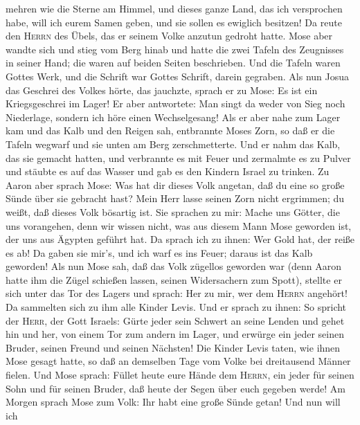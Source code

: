 mehren wie die Sterne am Himmel, und dieses ganze Land, das ich
versprochen habe, will ich eurem Samen geben, und sie sollen es ewiglich
besitzen!  Da reute den \textsc{Herrn} des Übels, das er
seinem Volke anzutun gedroht hatte.  Mose aber wandte
sich und stieg vom Berg hinab und hatte die zwei Tafeln des Zeugnisses
in seiner Hand; die waren auf beiden Seiten beschrieben. 
Und die Tafeln waren Gottes Werk, und die Schrift war Gottes Schrift,
darein gegraben.  Als nun Josua das Geschrei des Volkes
hörte, das jauchzte, sprach er zu Mose: Es ist ein Kriegsgeschrei im
Lager!  Er aber antwortete: Man singt da weder von Sieg
noch Niederlage, sondern ich höre einen Wechselgesang! 
Als er aber nahe zum Lager kam und das Kalb und den Reigen sah,
entbrannte Moses Zorn, so daß er die Tafeln wegwarf und sie unten am
Berg zerschmetterte.  Und er nahm das Kalb, das sie
gemacht hatten, und verbrannte es mit Feuer und zermalmte es zu Pulver
und stäubte es auf das Wasser und gab es den Kindern Israel zu trinken.
 Zu Aaron aber sprach Mose: Was hat dir dieses Volk
angetan, daß du eine so große Sünde über sie gebracht hast?
 Mein Herr lasse seinen Zorn nicht ergrimmen; du weißt,
daß dieses Volk bösartig ist.  Sie sprachen zu mir: Mache
uns Götter, die uns vorangehen, denn wir wissen nicht, was aus diesem
Mann Mose geworden ist, der uns aus Ägypten geführt hat. 
Da sprach ich zu ihnen: Wer Gold hat, der reiße es ab! Da gaben sie
mir's, und ich warf es ins Feuer; daraus ist das Kalb geworden!
 Als nun Mose sah, daß das Volk zügellos geworden war
(denn Aaron hatte ihm die Zügel schießen lassen, seinen Widersachern zum
Spott),  stellte er sich unter das Tor des Lagers und
sprach: Her zu mir, wer dem \textsc{Herrn} angehört! Da sammelten sich
zu ihm alle Kinder Levis.  Und er sprach zu ihnen: So
spricht der \textsc{Herr}, der Gott Israels: Gürte jeder sein Schwert an
seine Lenden und gehet hin und her, von einem Tor zum andern im Lager,
und erwürge ein jeder seinen Bruder, seinen Freund und seinen Nächsten!
 Die Kinder Levis taten, wie ihnen Mose gesagt hatte, so
daß an demselben Tage vom Volke bei dreitausend Männer fielen.
 Und Mose sprach: Füllet heute eure Hände dem
\textsc{Herrn}, ein jeder für seinen Sohn und für seinen Bruder, daß
heute der Segen über euch gegeben werde!  Am Morgen
sprach Mose zum Volk: Ihr habt eine große Sünde getan! Und nun will ich
